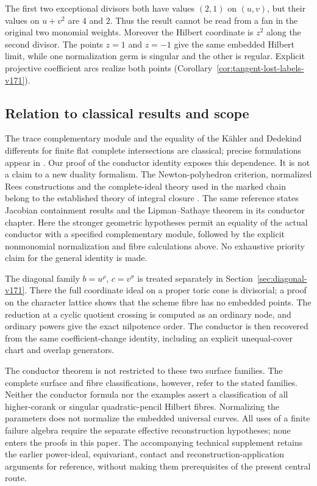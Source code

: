 \documentclass[11pt,reqno]{amsart}
\numberwithin{equation}{section}
\theoremstyle{definition}\newtheorem{definition}[theorem]{Definition}
\theoremstyle{remark}\newtheorem{remark}[theorem]{Remark}
\begin{document}
The first two exceptional divisors both have values $(2,1)$ on
$(u,v)$, but their values on $u+v^2$ are $4$ and $2$. Thus the result
cannot be read from a fan in the original two monomial weights.
Moreover the Hilbert coordinate is $z^2$ along the second divisor.
The points $z=1$ and $z=-1$ give the same embedded Hilbert limit,
while one normalization germ is singular and the other is regular.
Explicit projective coefficient arcs realize both points
(Corollary~\ref{cor:tangent-lost-labels-v171}).

\subsection{Relation to classical results and scope}
The trace complementary module and the equality of the K\"ahler and
Dedekind differents for finite flat complete intersections are
classical; precise formulations appear in
\cite[Sections 49.8, 49.12 and 49.15]{Stacks171}. Our proof of the
conductor identity exposes this dependence. It is not a claim to a
new duality formalism. The Newton-polyhedron criterion, normalized
Rees constructions and the complete-ideal theory used in the marked
chain belong to the established theory of integral closure
\cite[Chapters 1, 5 and 14]{HunekeSwanson171}. The same reference
states Jacobian containment results and the Lipman--Sathaye theorem
in its conductor chapter. Here the stronger geometric hypotheses
permit an equality of the actual conductor with a specified
complementary module, followed by the explicit nonmonomial
normalization and fibre calculations above. No exhaustive priority
claim for the general identity is made.

The diagonal family $b=u^\rho$, $c=v^\sigma$ is treated separately in
Section~\ref{sec:diagonal-v171}. There the full coordinate ideal on a
proper toric cone is divisorial; a proof on the character lattice
shows that the scheme fibre has no embedded points. The reduction
at a cyclic quotient crossing is computed as an ordinary node, and
ordinary powers give the exact nilpotence order. The conductor is
then recovered from the same coefficient-change identity, including
an explicit unequal-cover chart and overlap generators.

The conductor theorem is not restricted to these two surface
families. The complete surface and fibre classifications, however,
refer to the stated families. Neither the conductor formula nor the
examples assert a classification of all higher-corank or singular
quadratic-pencil Hilbert fibres. Normalizing the parameters does
not normalize the embedded universal curves. All uses of a finite
failure algebra require the separate effective reconstruction
hypotheses; none enters the proofs in this paper. The accompanying
technical supplement retains the earlier power-ideal, equivariant,
contact and reconstruction-application arguments for reference,
without making them prerequisites of the present central route.
\end{document}
